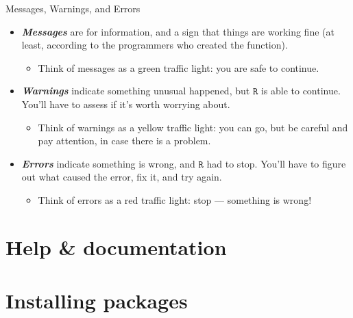 \documentclass[
  11pt,
  ignorenonframetext,
]{beamer}
\providecommand{\tightlist}{%
  \setlength{\itemsep}{0pt}\setlength{\parskip}{0pt}}
\begin{document}
\begin{frame}{Messages, Warnings, and Errors}
\protect\hypertarget{messages-warnings-and-errors}{}
\begin{itemize}
\item
  \textbf{\emph{Messages}} are for information, and a sign that things
  are working fine (at least, according to the programmers who created
  the function).

  \begin{itemize}
  \tightlist
  \item
    \textcolor[rgb]{0,0.6,0}{Think of messages as a green traffic light: you are safe to continue.}
  \end{itemize}
\item
  \textbf{\emph{Warnings}} indicate something unusual happened, but
  \(\texttt{R}\) is able to continue. You'll have to assess if it's
  worth worrying about.

  \begin{itemize}
  \tightlist
  \item
    \textcolor[rgb]{0.9,0.7,0}{Think of warnings as a yellow traffic light: you can go, but be careful and pay attention, in case there is a problem.
    }
  \end{itemize}
\item
  \textbf{\emph{Errors}} indicate something is wrong, and \(\texttt{R}\)
  had to stop. You'll have to figure out what caused the error, fix it,
  and try again.

  \begin{itemize}
  \tightlist
  \item
    \textcolor[rgb]{0.8,0,0}{Think of errors as a red traffic light: stop --- something is wrong!
    }
  \end{itemize}
\end{itemize}

\end{frame}

\hypertarget{help-documentation}{%
\section{Help \& documentation}\label{help-documentation}}

\hypertarget{installing-packages}{%
\section{Installing packages}\label{installing-packages}}
\end{document}
